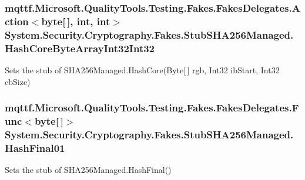 \hypertarget{class_system_1_1_security_1_1_cryptography_1_1_fakes_1_1_stub_s_h_a256_managed_a364cdcecb12ebf7f14faf3ea92fb19b0}{
\subsubsection[{Hash\-Core\-Byte\-Array\-Int32\-Int32}]{\setlength{\rightskip}{0pt plus 5cm}mqttf.\-Microsoft.\-Quality\-Tools.\-Testing.\-Fakes.\-Fakes\-Delegates.\-Action$<$byte\mbox{[}$\,$\mbox{]}, int, int$>$ System.\-Security.\-Cryptography.\-Fakes.\-Stub\-S\-H\-A256\-Managed.\-Hash\-Core\-Byte\-Array\-Int32\-Int32}}\label{class_system_1_1_security_1_1_cryptography_1_1_fakes_1_1_stub_s_h_a256_managed_a364cdcecb12ebf7f14faf3ea92fb19b0}


Sets the stub of S\-H\-A256\-Managed.\-Hash\-Core(\-Byte\mbox{[}$\,$\mbox{]} rgb, Int32 ib\-Start, Int32 cb\-Size)

\hypertarget{class_system_1_1_security_1_1_cryptography_1_1_fakes_1_1_stub_s_h_a256_managed_a6d9644f885a2ad8ef5bac869569c5cba}{
\subsubsection[{Hash\-Final01}]{\setlength{\rightskip}{0pt plus 5cm}mqttf.\-Microsoft.\-Quality\-Tools.\-Testing.\-Fakes.\-Fakes\-Delegates.\-Func$<$byte\mbox{[}$\,$\mbox{]}$>$ System.\-Security.\-Cryptography.\-Fakes.\-Stub\-S\-H\-A256\-Managed.\-Hash\-Final01}}\label{class_system_1_1_security_1_1_cryptography_1_1_fakes_1_1_stub_s_h_a256_managed_a6d9644f885a2ad8ef5bac869569c5cba}


Sets the stub of S\-H\-A256\-Managed.\-Hash\-Final()

